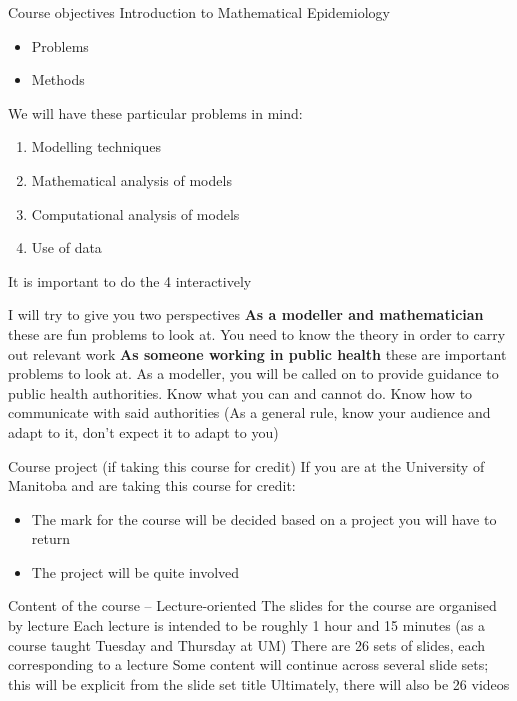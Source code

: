 \documentclass[aspectratio=169]{beamer}\usepackage[]{graphicx}\usepackage[]{xcolor}
\begin{document}
\begin{frame}{Course objectives}
Introduction to Mathematical Epidemiology
\begin{itemize}
    \item Problems
    \item Methods
\end{itemize}
\vfill
We will have these particular problems in mind:
\begin{enumerate}
    \item Modelling techniques
    \item Mathematical analysis of models
    \item Computational analysis of models
    \item Use of data
\end{enumerate}
\vfill
It is important to do the 4 interactively
\end{frame} 

\begin{frame}{I will try to give you two perspectives}
\bbullet\textbf{As a modeller and mathematician} these are fun problems to look at. You need to know the theory in order to carry out relevant work
\vfill
\bbullet\textbf{As someone working in public health} these are important problems to look at.
As a modeller, you will be called on to provide guidance to public health authorities. Know what you can and cannot do. Know how to communicate with said authorities
\vfill
(As a general rule, know your audience and adapt to it, don't expect it to adapt to you)
\end{frame}


\begin{frame}{Course project (if taking this course for credit)}
	If you are at the University of Manitoba and are taking this course for credit:
	\vfill
	\begin{itemize}
		\item The mark for the course will be decided based on a project you will have to return
		\vfill
		\item The project will be quite involved
	\end{itemize}
\end{frame}


\begin{frame}{Content of the course -- Lecture-oriented}
    The slides for the course are organised by lecture
    \vfill
    Each lecture is intended to be roughly 1 hour and 15 minutes (as a course taught Tuesday and Thursday at UM)
    \vfill
    There are 26 sets of slides, each corresponding to a lecture
    \vfill
    Some content will continue across several slide sets; this will be explicit from the slide set title
    \vfill
    Ultimately, there will also be 26 videos
\end{frame}
\end{document}

